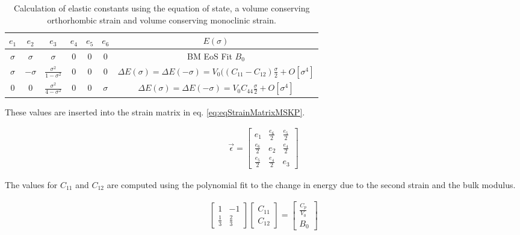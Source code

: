 \renewcommand{\arraystretch}{1.7}
\begin{table}[!htbp]
\centering
\begin{tabular}{c c c c c c c}
\hline\hline
$e_1$ & $e_2$ & $e_3$ & $e_4$ & $e_5$ & $e_6$ & $E(\sigma)$ \\
\hline\hline
$\sigma$ & $\sigma$ & $\sigma$ & 0 & 0 & 0 & BM EoS Fit $B_0$\\
$\sigma$ & $-\sigma$ & $\frac{\sigma^2}{1 - \sigma^2}$ & 0 & 0 & 0 & $\Delta E(\sigma) = \Delta E(-\sigma) = V_{0} ((C_{11} - C_{12}) \frac{\sigma}{2} + O[\sigma^4]$ \\
0 & 0 & $\frac{\sigma^2}{4 - \sigma^2}$ & 0 & 0 & $\sigma$ & $\Delta E(\sigma) = \Delta E(-\sigma) = V_{0} C_{44} \frac{\sigma}{2} + O[\sigma^4]$ \\
\end{tabular}
\label{tab:mskp1993}
\caption{Calculation of elastic constants using the equation of state, a volume conserving orthorhombic strain and volume conserving monoclinic strain.\cite{elasticpropertiesmehl}\cite{mehlsp}}
\end{table}

These values are inserted into the strain matrix in eq. \ref{eq:eqStrainMatrixMSKP}.

\begin{equation}
\begin{split}
\vec{\epsilon} = \begin{bmatrix} e_1 & \frac{e_6}{2} & \frac{e_5}{2} \\ \frac{e_6}{2} & e_2 & \frac{e_4}{2} \\ \frac{e_5}{2} & \frac{e_4}{2} & e_3 \end{bmatrix}
\end{split}
\label{eq:eqStrainMatrixMSKP}
\end{equation}

The values for $C_{11}$ and $C_{12}$ are computed using the polynomial fit to the change in energy due to the second strain and the bulk modulus.

\begin{equation}
\begin{split}
	\begin{bmatrix} 1 & -1 \\ \frac{1}{3} & \frac{2}{3} \end{bmatrix} \begin{bmatrix} C_{11} \\ C_{12} \end{bmatrix} = \begin{bmatrix} \frac{C_{p}}{V_0} \\ B_0 \end{bmatrix}
\end{split}
\label{eq:eqC11C12elastic}
\end{equation}



